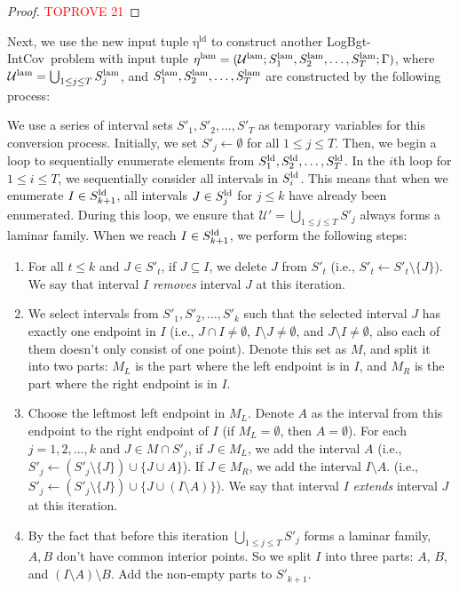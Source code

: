 \documentclass[11pt,a4paper]{article} \usepackage{enumitem}
\newcommand{\calU}{\mathcal{U}}
\newcommand{\LBOintcov}{\textsf{LogBgt-IntCov}}
\newcommand{\ldS}[1]{\ifx\relax#1\relax
    S^{\operatorname{ld}} \else
    S^{\operatorname{ld}}_{#1} \fi
}
\newcommand{\ldeta}{\operatorname{\eta^{ld}}}
\newcommand{\lamU}{\operatorname{\calU^{lam}}}
\newcommand{\lamS}[1]{\ifx\relax#1\relax
    S^{\operatorname{lam}}
  \else
    S^{\operatorname{lam}}_{#1} 
  \fi
}
\newcommand{\lameta}{\operatorname{\eta^{lam}}}
\theoremstyle{definition}
\begin{document}
\begin{proof}\textcolor{red}{TOPROVE 21}\end{proof}

Next, we use the new input tuple $\ldeta$ to construct another \LBOintcov\ problem with input tuple $\lameta = (\lamU; \lamS{1}, \lamS{2}, \ldots, \lamS{T}; \Gamma)$, where $\lamU = \bigcup_{1 \leq j \leq T} \lamS{j}$, and $\lamS{1}, \lamS{2}, \ldots, \lamS{T}$ are constructed by the following process:

We use a series of interval sets $S'_1, S'_2, \dots, S'_T$ as temporary variables for this conversion process. Initially, we set $S'_j \gets \emptyset$ for all $1 \leq j \leq T$. 
Then, we begin a loop to sequentially enumerate elements from $\ldS{1}, \ldS{2}, \dots, \ldS{T}$. In the $i$th loop
for $1\leq i\leq T$, we sequentially consider all intervals in $\ldS{i}$. This means that when we enumerate $I \in \ldS{k+1}$, all intervals $J \in \ldS{j}$ for $j \leq k$ have already been enumerated. 
During this loop, we ensure that $\calU' = \bigcup_{1 \leq j \leq T} S'_j$ always forms a laminar family. When we reach $I \in \ldS{k+1}$, we perform the following steps:

\begin{enumerate}
\item For all $t \leq k$ and $J \in S'_t$, if $J \subseteq I$, we delete $J$ from $S'_t$ (i.e., $S'_t \gets S'_t \setminus \{J\}$). We say that interval $I$ \emph{removes} interval $J$ at this iteration.

\item We select intervals from $S'_1, S'_2, \dots, S'_k$ such that the selected interval $J$ has exactly one endpoint in $I$ (i.e., $J \cap I \neq \emptyset$, $I \setminus J \neq \emptyset$, and $J \setminus I \neq \emptyset$, also each of them doesn't only consist of one point). Denote this set as $M$, and split it into two parts: $M_L$ is the part where the left endpoint is in $I$, and $M_R$ is the part where the right endpoint is in $I$.

\item Choose the leftmost left endpoint in $M_L$. Denote $A$ as the interval from this endpoint to the right endpoint of $I$ (if $M_L = \emptyset$, then $A = \emptyset$). 
For each $j = 1, 2, \ldots, k$ and $J \in M \cap S'_j$, 
if $J \in M_L$, we add the interval $A$ (i.e., $S'_j \gets (S'_j \setminus \{J\}) \cup \{J \cup A\}$).
If $J \in M_R$, we add the interval $I\setminus A$. (i.e., $S'_j \gets (S'_j \setminus \{J\}) \cup \{J \cup (I\setminus A)\}$).
We say that interval $I$ \emph{extends} interval $J$ at this iteration.

\item By the fact that before this iteration $\bigcup_{1 \leq j \leq T} S'_j$ forms a laminar family, $A,B$ don't have common interior points. So we split $I$ into three parts: $A$, $B$, and $(I \setminus A) \setminus B$. Add the non-empty parts to $S'_{k+1}$.
\end{enumerate}
\end{document}
